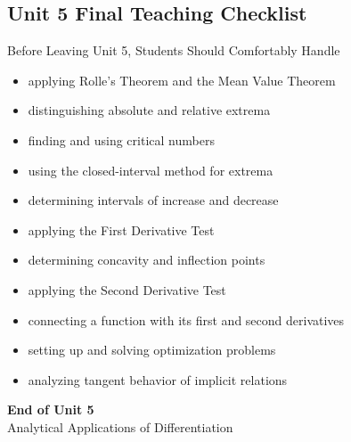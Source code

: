 \documentclass[11pt]{article}
\begin{document}
\newpage
\subsection{Unit 5 Final Teaching Checklist}

\begin{theorybox}{Before Leaving Unit 5, Students Should Comfortably Handle}
\begin{itemize}
    \item applying Rolle’s Theorem and the Mean Value Theorem
    \item distinguishing absolute and relative extrema
    \item finding and using critical numbers
    \item using the closed-interval method for extrema
    \item determining intervals of increase and decrease
    \item applying the First Derivative Test
    \item determining concavity and inflection points
    \item applying the Second Derivative Test
    \item connecting a function with its first and second derivatives
    \item setting up and solving optimization problems
    \item analyzing tangent behavior of implicit relations
\end{itemize}
\end{theorybox}

\vfill
\begin{center}
{\Large\color{novelPurpleDark}\textbf{End of Unit 5}}\\[0.35em]
{\large Analytical Applications of Differentiation}
\end{center}
\end{document}
